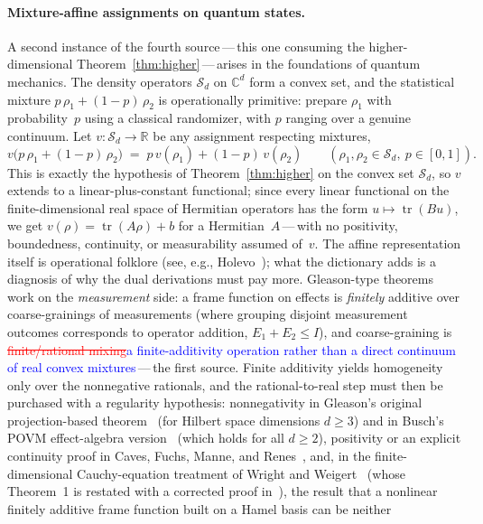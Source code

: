 \documentclass{article}
\newcommand{\ReviewAdd}[1]{\textcolor{blue}{#1}}
\newcommand{\ReviewDel}[1]{\textcolor{red}{\sout{#1}}}
\theoremstyle{plain}
\theoremstyle{definition}
\newcommand{\R}{\mathbb{R}}
\begin{document}
\paragraph{Mixture-affine assignments on quantum states.}
A second instance of the fourth source\,---\,this one consuming the
higher-dimensional Theorem~\ref{thm:higher}\,---\,arises in the
foundations of quantum mechanics. The density operators
$\mathcal{S}_d$ on $\mathbb{C}^d$ form a convex set, and the
statistical mixture $p\,\rho_1+(1-p)\,\rho_2$ is operationally
primitive: prepare $\rho_1$ with probability~$p$ using a classical
randomizer, with $p$ ranging over a genuine continuum. Let
$v\colon\mathcal{S}_d\to\R$ be any assignment respecting mixtures,
\[
v\bigl(p\,\rho_1+(1-p)\,\rho_2\bigr)\;=\;p\,v(\rho_1)+(1-p)\,v(\rho_2)
\qquad(\rho_1,\rho_2\in\mathcal{S}_d,\ p\in[0,1]).
\]
This is exactly the hypothesis of Theorem~\ref{thm:higher} on the
convex set $\mathcal{S}_d$, so $v$ extends to a linear-plus-constant
functional; since every linear functional on the finite-dimensional
real space of Hermitian operators has the form
$u\mapsto\operatorname{tr}(Bu)$, we get
$v(\rho)=\operatorname{tr}(A\rho)+b$ for a Hermitian~$A$\,---\,with
no positivity, boundedness, continuity, or measurability assumed
of~$v$. The affine representation itself is operational folklore
(see, e.g., Holevo~\cite[Lemma~1.6.1]{Holevo1982}); what the
dictionary adds is a diagnosis of why the dual derivations must pay
more. Gleason-type theorems work on the \emph{measurement} side: a
frame function on effects is \emph{finitely} additive over
coarse-grainings of measurements (where grouping disjoint measurement
outcomes corresponds to operator addition, $E_1 + E_2 \le I$), and
coarse-graining is \ReviewDel{finite/rational mixing}\ReviewAdd{a finite-additivity operation rather than a direct continuum of real convex mixtures}\,---\,the first source.
Finite additivity yields homogeneity only over the nonnegative
rationals, and the rational-to-real step must then be purchased with
a regularity hypothesis: nonnegativity in Gleason's original
projection-based theorem~\cite{Gleason1957} (for Hilbert space dimensions $d \ge 3$) and in Busch's POVM effect-algebra
version~\cite{Busch2003} (which holds for all $d \ge 2$), positivity or an explicit continuity proof
in Caves, Fuchs, Manne, and Renes~\cite{CFMR2004}, and, in the
finite-dimensional Cauchy-equation treatment of Wright and
Weigert~\cite{WrightWeigert2019} (whose Theorem~1 is restated with a
corrected proof in~\cite{WrightWeigert2020}), the result that a nonlinear
finitely additive frame function built on a Hamel basis can be neither
\end{document}
